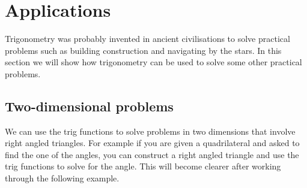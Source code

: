 \section{Applications}
 \label{m39411*id81626}Trigonometry was probably invented in ancient civilisations to solve practical problems such as building construction and navigating by the stars. In this section we will show how trigonometry can be used to solve some other practical problems.\par 
            \subsection{ Two-dimensional problems}
            \nopagebreak
            \label{m39408*eip-153}
We can use the trig functions to solve problems in two dimensions that involve right angled triangles. For example if you are given a quadrilateral and asked to find the one of the angles, you can construct a right angled triangle and use the trig functions to solve for the angle. This will become clearer after working through the following example.
\par \label{m39408*eip-187}\vspace{.5cm} 
      \noindent
